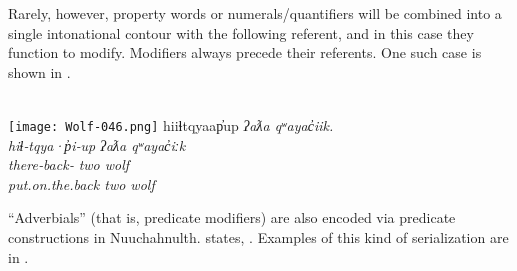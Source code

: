 \noindent Rarely, however, property words or numerals/quantifiers will be combined into a single intonational contour with the following referent, and in this case they function to modify. Modifiers always precede their referents. One such case is shown in .

\begin{exe}
  \ex\label{ex:3.16}
  \\
  \texttt{[image: Wolf-046.png]}
  \gllll hiiɬtqyaap̓up            \em{ʔaƛa} qʷayac̓iik.\\
         hiɬ‑tqya·p̓i‑up          \em{ʔaƛa} qʷayac̓iːk\\
         there‑back‑ \em{two}  wolf\\
         put.on.the.back         \em{two}  wolf\\
         \vfix
\end{exe}

\enquote{Adverbials} (that is, predicate modifiers) are also encoded via predicate constructions in Nuuchahnulth. \citeauthor{Nakayama2001} states, . Examples of this kind of serialization are in .

